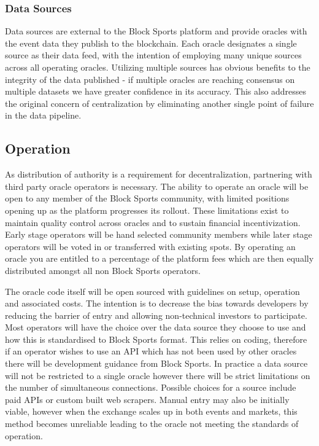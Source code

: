 \documentclass{article}
\begin{document}
		\subsubsection{Data Sources}
Data sources are external to the Block Sports platform and provide oracles with the event data they publish to the blockchain. Each oracle designates a single source as their data feed, with the intention of employing many unique sources across all operating oracles. Utilizing multiple sources has obvious benefits to the integrity of the data published - if multiple oracles are reaching consensus on multiple datasets we have greater confidence in its accuracy. This also addresses the original concern of centralization by eliminating another single point of failure in the data pipeline. 

	\subsection{Operation}
As distribution of authority is a requirement for decentralization, partnering with third party oracle operators is necessary. The ability to operate an oracle will be open to any member of the Block Sports community, with limited positions opening up as the platform progresses its rollout. These limitations exist to maintain quality control across oracles and to sustain financial incentivization. Early stage operators will be hand selected community members while later stage operators will be voted in or transferred with existing spots. By operating an oracle you are entitled to a percentage of the platform fees which are then equally distributed amongst all non Block Sports operators.

The oracle code itself will be open sourced with guidelines on setup, operation and associated costs. The intention is to decrease the bias towards developers by reducing the barrier of entry and allowing non-technical investors to participate. Most operators will have the choice over the data source they choose to use and how this is standardised to Block Sports format. This relies on coding, therefore if an operator wishes to use an API which has not been used by other oracles there will be development guidance from Block Sports. In practice a data source will not be restricted to a single oracle however there will be strict limitations on the number of simultaneous connections. Possible choices for a source include paid APIs or custom built web scrapers. Manual entry may also be initially viable, however when the exchange scales up in both events and markets, this method becomes unreliable leading to the oracle not meeting the standards of operation. 
\end{document}
